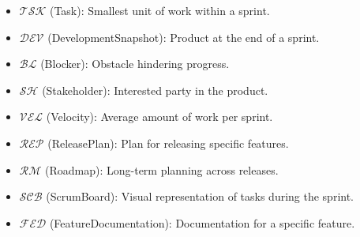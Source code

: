 \documentclass[11pt,a4paper]{article}
\begin{document}
\begin{itemize}
  \item $\mathcal{TSK}$ (Task): Smallest unit of work within a sprint.
  \item $\mathcal{DEV}$ (DevelopmentSnapshot): Product at the end of a sprint.
  \item $\mathcal{BL}$ (Blocker): Obstacle hindering progress.
  \item $\mathcal{SH}$ (Stakeholder): Interested party in the product.
  \item $\mathcal{VEL}$ (Velocity): Average amount of work per sprint.
  \item $\mathcal{REP}$ (ReleasePlan): Plan for releasing specific features.
  \item $\mathcal{RM}$ (Roadmap): Long-term planning across releases.
  \item $\mathcal{SCB}$ (ScrumBoard): Visual representation of tasks during the sprint.
  \item $\mathcal{FED}$ (FeatureDocumentation): Documentation for a specific feature.
\end{itemize}
\end{document}
